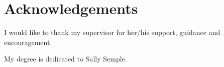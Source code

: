 %
\chapter*{Acknowledgements}
\label{sec:acknowledgement}
\vspace*{-10mm}


I would like to thank my supervisor \thesisFirstSupervisor  for her/his support, guidance and 
encouragement. 

My degree is dedicated to Sally Semple.

